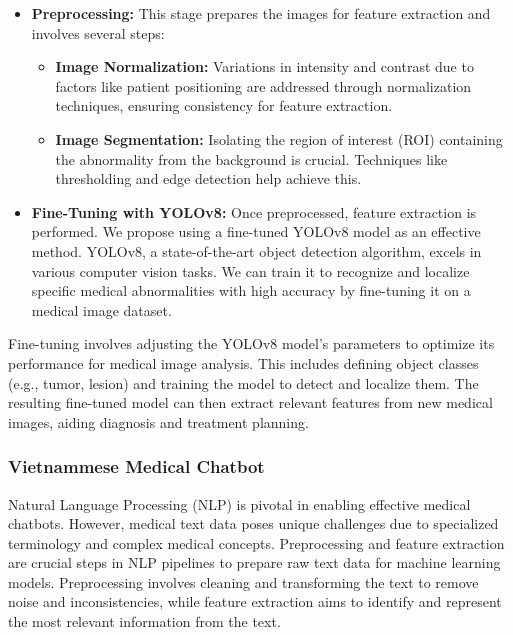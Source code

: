 \documentclass[conference]{IEEEtran}
\begin{document}
        \begin{itemize}
          \item \textbf{Preprocessing:} This stage prepares the images for feature extraction and involves several steps:
            \begin{itemize}
                \item \textbf{Image Normalization:} Variations in intensity and contrast due to factors like patient positioning are addressed through normalization techniques, ensuring consistency for feature extraction.
                \item \textbf{Image Segmentation:} Isolating the region of interest (ROI) containing the abnormality from the background is crucial. Techniques like thresholding and edge detection help achieve this.
            \end{itemize}
          \item \textbf{Fine-Tuning with YOLOv8:} Once preprocessed, feature extraction is performed. We propose using a fine-tuned YOLOv8 model as an effective method. YOLOv8, a state-of-the-art object detection algorithm, excels in various computer vision tasks. We can train it to recognize and localize specific medical abnormalities with high accuracy by fine-tuning it on a medical image dataset.
        \end{itemize}
        Fine-tuning involves adjusting the YOLOv8 model's parameters to optimize its performance for medical image analysis. This includes defining object classes (e.g., tumor, lesion) and training the model to detect and localize them. The resulting fine-tuned model can then extract relevant features from new medical images, aiding diagnosis and treatment planning.

    \subsubsection{Vietnammese Medical Chatbot}
    Natural Language Processing (NLP) is pivotal in enabling effective medical chatbots. However, medical text data poses unique challenges due to specialized terminology and complex medical concepts. Preprocessing and feature extraction are crucial steps in NLP pipelines to prepare raw text data for machine learning models. Preprocessing involves cleaning and transforming the text to remove noise and inconsistencies, while feature extraction aims to identify and represent the most relevant information from the text.
    
\end{document}
